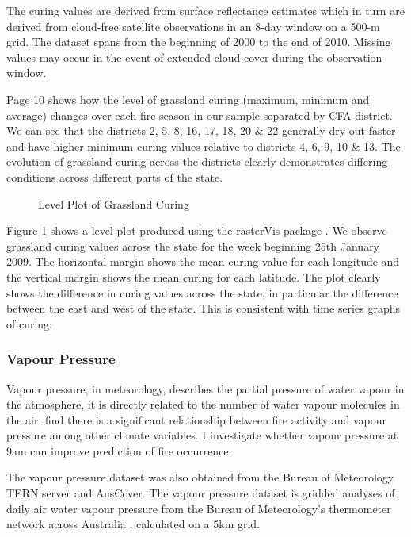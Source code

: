 \documentclass[11pt,a4paper]{article}
\begin{document}
The curing values are derived from surface reflectance estimates which in turn are derived from cloud-free satellite observations in an 8-day window on a 500-m grid. The dataset spans from the beginning of 2000 to the end of 2010. Missing values may occur in the event of extended cloud cover during the observation window.

Page 10 shows how the level of grassland curing (maximum, minimum and average) changes over each fire season in our sample separated by CFA district. We can see that the districts 2, 5, 8, 16, 17, 18, 20 \&  22 generally dry out faster and have higher minimum curing values relative to districts 4, 6, 9, 10 \& 13. The evolution of grassland curing across the districts clearly demonstrates differing conditions across different parts of the state. 

%


\begin{figure}[!ht]
	\centering 
	\caption{Level Plot of Grassland Curing } 
	\label{fig:cur_lp} 
\end{figure}


Figure \ref{fig:cur_lp} shows a level plot produced using the rasterVis package \citep{rastervis}. We observe grassland curing values across the state for the week beginning 25th January 2009. The horizontal margin shows the mean curing value for each longitude and the vertical margin shows the mean curing for each latitude. The plot clearly shows the difference in curing values across the state, in particular the difference between the east and west of the state. This is consistent with time series graphs of curing. 

\subsubsection{Vapour Pressure}
Vapour pressure, in meteorology, describes the partial pressure of water vapour in the atmosphere, it is directly related to the number of water vapour molecules in the air.  \citet{harris14} find there is a significant relationship between fire activity and vapour pressure among other climate variables. I investigate whether vapour pressure at 9am can improve prediction of fire occurrence. 

The vapour pressure dataset was also obtained from the Bureau of Meteorology TERN server and AusCover. The vapour pressure dataset is gridded analyses of daily air water vapour pressure from the Bureau of Meteorology's thermometer network across Australia \citep{jones09}, calculated on a 5km grid. 
\end{document}
